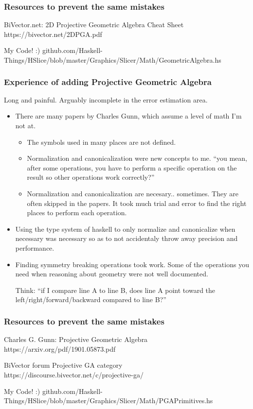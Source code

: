 \documentclass[hyperref={pdfpagemode=FullScreen},aspectratio=169]{beamer}
\begin{document}
\begin{frame}
  \frametitle{Resources to prevent the same mistakes}
  \begin{block}{BiVector.net: 2D Projective Geometric Algebra Cheat Sheet}
    https://bivector.net/2DPGA.pdf
  \end{block}
  \begin{block}{My Code! :)}
    github.com/Haskell-Things/HSlice/blob/master/Graphics/Slicer/Math/GeometricAlgebra.hs
  \end{block}
\end{frame}

\begin{frame}
  \frametitle{Experience of adding Projective Geometric Algebra}
  Long and painful. Arguably incomplete in the error estimation area.
  \begin{itemize}
  \item There are many papers by Charles Gunn, which assume a level of math I'm not at.
    \begin{itemize}
    \item The symbols used in many places are not defined.
    \item Normalization and canonicalization were new concepts to me. ``you mean, after some operations, you have to perform a specific operation on the result so other operations work correctly?''
    \item Normalization and canonicalization are necesary.. sometimes. They are often skipped in the papers. It took much trial and error to find the right places to perform each operation.
    \end{itemize}
  \item Using the type system of haskell to only normalize and canonicalize when necessary was necessary so as to not accidentaly throw away precision and performance.
  \item Finding symmetry breaking operations took work. Some of the operations you need when reasoning about geometry were not well documented.\par
    Think: ``if I compare line A to line B, does line A point toward the left/right/forward/backward compared to line B?''
  \end{itemize}
\end{frame}

\begin{frame}
  \frametitle{Resources to prevent the same mistakes}
  \begin{block}{Charles G. Gunn: Projective Geometric Algebra}
    https://arxiv.org/pdf/1901.05873.pdf
  \end{block}
  \begin{block}{BiVector forum Projective GA category}
   https://discourse.bivector.net/c/projective-ga/
  \end{block}
  \begin{block}{My Code! :)}
    github.com/Haskell-Things/HSlice/blob/master/Graphics/Slicer/Math/PGAPrimitives.hs
  \end{block}
\end{frame}
\end{document}
